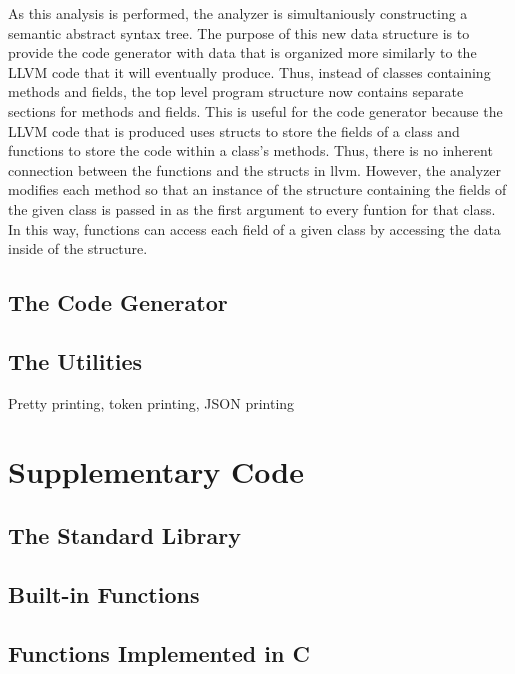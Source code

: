 \begin{homeworkProblem}
    As this analysis is performed, the analyzer is simultaniously constructing a semantic abstract syntax tree. The purpose of this new data structure is to provide the code generator with data that is organized more similarly to the LLVM code that it will eventually produce. Thus, instead of classes containing methods and fields, the top level program structure now contains separate sections for methods and fields. This is useful for the code generator because the LLVM code that is produced uses structs to store the fields of a class and functions to store the code within a class's methods. Thus, there is no inherent connection between the functions and the structs in llvm. However, the analyzer modifies each method so that an instance of the structure containing the fields of the given class is passed in as the first argument to every funtion for that class. In this way, functions can access each field of a given class by accessing the data inside of the structure. 

	\subsection{The Code Generator}
	\subsection{The Utilities}
	Pretty printing, token printing, JSON printing
	\section{Supplementary Code}
	\subsection{The Standard Library}
	\subsection{Built-in Functions}
	\subsection{Functions Implemented in C}
\end{homeworkProblem}
